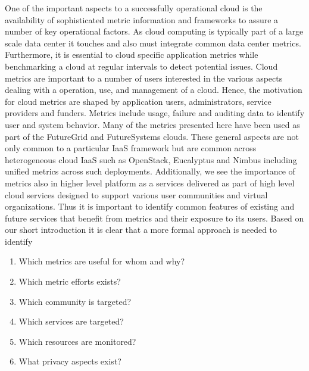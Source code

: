 \documentclass{sig-alternate-05-2015}
\begin{document}
One of the important aspects to a successfully operational cloud is the availability of sophisticated metric information and frameworks to assure a number of key operational factors. As cloud computing is typically part of a large scale data center it touches and also must integrate common data center metrics. Furthermore, it is essential to cloud specific application metrics while benchmarking a cloud at regular intervals to detect potential issues. Cloud metrics are important to a number of users interested in the various aspects dealing with a operation, use, and management of a cloud. Hence, the motivation for cloud metrics are shaped by application users, administrators, service providers and funders. Metrics include usage, failure and auditing data to identify user and system behavior. Many of the metrics presented here have been used as part of the FutureGrid and FutureSystems clouds. These general aspects are not only common to a particular IaaS framework but are common across heterogeneous cloud IaaS such as OpenStack, Eucalyptus and Nimbus including unified metrics across such deployments.  Additionally, we see the importance of metrics also in higher level platform as a services delivered as part of high level cloud services designed to support various user communities and virtual organizations. Thus it is important to identify common features of existing and future services that benefit from metrics and their exposure to its users. Based on our short introduction it is clear that a more formal approach is needed to identify

\begin{enumerate}
\setlength\itemsep{-2pt}
\item Which metrics are useful for whom and why?
\item Which metric efforts exists?
\item Which community is targeted?
\item Which services are targeted?
\item Which resources are monitored?
\item What privacy aspects exist? 
\end{enumerate}
\end{document}
